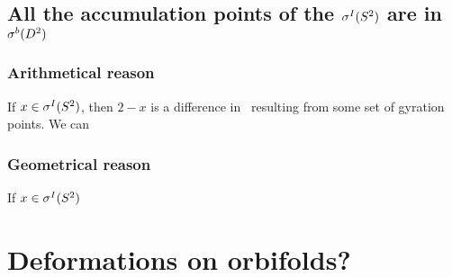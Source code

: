 \subsection{All the accumulation points of the ${\mathcal{\sigma}^I(S^2)}$ are in ${\mathcal{\sigma}^b(D^2)}$}
\subsubsection{Arithmetical reason}
If $x \in {\mathcal{\sigma}^I(S^2)}$, then $2-x$ is a difference in \Eoc\ resulting from some set of gyration points. 
We can 
\subsubsection{Geometrical reason}
If $x \in {\mathcal{\sigma}^I(S^2)}$ 











\section{Deformations on orbifolds?}
